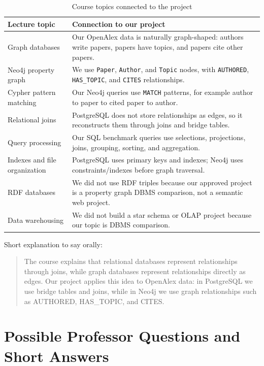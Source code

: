 \documentclass[11pt]{article}
\begin{document}
\begin{table}[H]
\centering
\small
\begin{tabular}{|p{}|p{}|}
\hline
\textbf{Lecture topic} & \textbf{Connection to our project} \\
\hline
Graph databases & Our OpenAlex data is naturally graph-shaped: authors write papers, papers have topics, and papers cite other papers. \\
\hline
Neo4j property graph & We use \texttt{Paper}, \texttt{Author}, and \texttt{Topic} nodes, with \texttt{AUTHORED}, \texttt{HAS\_TOPIC}, and \texttt{CITES} relationships. \\
\hline
Cypher pattern matching & Our Neo4j queries use \texttt{MATCH} patterns, for example author to paper to cited paper to author. \\
\hline
Relational joins & PostgreSQL does not store relationships as edges, so it reconstructs them through joins and bridge tables. \\
\hline
Query processing & Our SQL benchmark queries use selections, projections, joins, grouping, sorting, and aggregation. \\
\hline
Indexes and file organization & PostgreSQL uses primary keys and indexes; Neo4j uses constraints/indexes before graph traversal. \\
\hline
RDF databases & We did not use RDF triples because our approved project is a property graph DBMS comparison, not a semantic web project. \\
\hline
Data warehousing & We did not build a star schema or OLAP project because our topic is DBMS comparison. \\
\hline
\end{tabular}
\caption{Course topics connected to the project}
\end{table}

Short explanation to say orally:

\begin{quote}
The course explains that relational databases represent relationships through joins, while graph databases represent relationships directly as edges. Our project applies this idea to OpenAlex data: in PostgreSQL we use bridge tables and joins, while in Neo4j we use graph relationships such as AUTHORED, HAS\_TOPIC, and CITES.
\end{quote}

\section{Possible Professor Questions and Short Answers}
\end{document}
